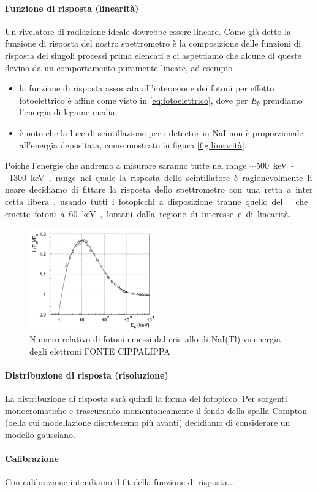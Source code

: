  \paragraph{Funzione di risposta (linearità)}
 Un rivelatore di radiazione ideale dovrebbe essere lineare. Come già detto la funzione di risposta del nostro spettrometro è la composizione delle funzioni di risposta dei singoli processi prima elencati e ci aspettiamo che alcune di queste devino da un comportamento puramente lineare, ad esempio
 \begin{itemize}
 	\item la funzione di risposta associata all'interazione dei fotoni per effetto fotoelettrico è affine come visto in \autoref{eq:fotoelettrico}, dove per $E_b$ prendiamo l'energia di legame media;
 	\item è noto che la luce di scintillazione per i detector in NaI non è proporzionale all'energia depositata, come mostrato in figura \autoref{fig:linearità}.
 \end{itemize}
 Poiché l'energie che andremo a misurare saranno tutte nel range $\sim$\SI{500}keV-\SI{1300}{keV}, range nel quale la risposta dello scintillatore è ragionevolmente lineare decidiamo di fittare la risposta dello spettrometro con una retta a intercetta libera, usando tutti i fotopicchi a disposizione tranne quello del \am\; che emette fotoni a \SI{60}keV, lontani dalla regione di interesse e di linearità.
 
 \begin{figure}[h]
	\centering
	\includegraphics[width=15em]{linearita}
	\caption{\label{fig:linearità}Numero relativo di fotoni emessi dal cristallo di NaI(Tl) vs energia degli elettroni FONTE CIPPALIPPA}
 \end{figure}
 
 \paragraph{Distribuzione di risposta (risoluzione)}
 La distribuzione di risposta sarà quindi la forma del fotopicco. Per sorgenti monocromatiche e trascurando momentaneamente il fondo della spalla Compton (della cui modellazione discuteremo più avanti) decidiamo di considerare un modello gaussiano.
 
 \paragraph{Calibrazione}
 Con calibrazione intendiamo il fit della funzione di risposta...
 
 
 
 
 
 